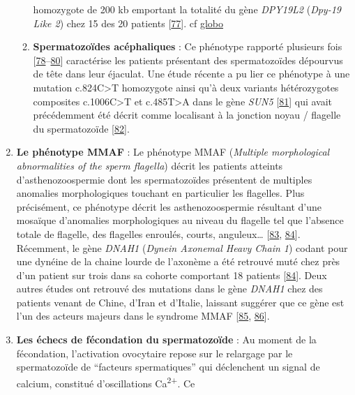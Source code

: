 \documentclass[12pt,a4paper,twoside]{ugathesis}
\theoremstyle{definition}
\theoremstyle{definition}
\theoremstyle{definition}
\theoremstyle{remark}
\begin{document}
\begin{enumerate}
\begin{enumerate}
    homozygote de 200 kb emportant la totalité du gène \emph{DPY19L2}
    (\emph{Dpy-19 Like 2}) chez 15 des 20 patients
    {[}\protect\hyperlink{ref-Harbuz2011}{77}{]}. cf
    \protect\hyperlink{globo}{globo}\\
  \item
    \textbf{Spermatozoïdes acéphaliques} : Ce phénotype rapporté
    plusieurs fois
    {[}\protect\hyperlink{ref-Chemes2010}{78}--\protect\hyperlink{ref-Chemes1987}{80}{]}
    caractérise les patients présentant des spermatozoïdes dépourvus de
    tête dans leur éjaculat. Une étude récente a pu lier ce phénotype à
    une mutation c.824C\textgreater{}T homozygote ainsi qu'à deux
    variants hétérozygotes composites c.1006C\textgreater{}T et
    c.485T\textgreater{}A dans le gène \emph{SUN5}
    {[}\protect\hyperlink{ref-Zhu2016}{81}{]} qui avait précédemment été
    décrit comme localisant à la jonction noyau / flagelle du
    spermatozoïde {[}\protect\hyperlink{ref-Yassine2015}{82}{]}.
  \end{enumerate}
\item
  \textbf{Le phénotype MMAF} : Le phénotype MMAF (\emph{Multiple
  morphological abnormalities of the sperm flagella}) décrit les
  patients atteints d'asthenozoospermie dont les spermatozoïdes
  présentent de multiples anomalies morphologiques touchant en
  particulier les flagelles. Plus précisément, ce phénotype décrit les
  asthenozoospermie résultant d'une mosaïque d'anomalies morphologiques
  au niveau du flagelle tel que l'absence totale de flagelle, des
  flagelles enroulés, courts, anguleux\ldots{}
  {[}\protect\hyperlink{ref-Coutton2015}{83},
  \protect\hyperlink{ref-BenKhelifa2014}{84}{]}. Récemment, le gène
  \emph{DNAH1} (\emph{Dynein Axonemal Heavy Chain 1}) codant pour une
  dynéine de la chaine lourde de l'axonème a été retrouvé muté chez près
  d'un patient sur trois dans sa cohorte comportant 18 patients
  {[}\protect\hyperlink{ref-BenKhelifa2014}{84}{]}. Deux autres études
  ont retrouvé des mutations dans le gène \emph{DNAH1} chez des patients
  venant de Chine, d'Iran et d'Italie, laissant suggérer que ce gène est
  l'un des acteurs majeurs dans le syndrome MMAF
  {[}\protect\hyperlink{ref-Wang2017}{85},
  \protect\hyperlink{ref-Amiri-Yekta2016}{86}{]}.
\item
  \textbf{Les échecs de fécondation du spermatozoïde} : Au moment de la
  fécondation, l'activation ovocytaire repose sur le relargage par le
  spermatozoïde de ``facteurs spermatiques'' qui déclenchent un signal
  de calcium, constitué d'oscillations Ca\textsuperscript{2+}. Ce

\end{enumerate}
\end{document}
